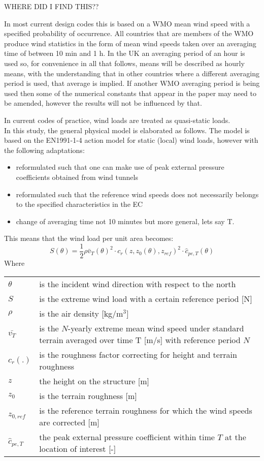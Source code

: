 WHERE DID I FIND THIS??
\begin{framed}
In most current design codes this is based on a WMO mean wind speed with a specified probability of occurrence. All countries that are members of the WMO produce wind statistics in the form of mean wind speeds taken over an averaging time of between 10 min and 1 h. In the UK an averaging period of an hour is used so, for convenience in all that follows, means will be described as hourly means, with the understanding that in other countries where a different averaging period is used, that average is implied. If another WMO averaging period is being used then some of the numerical constants that appear in the paper may need to be amended, however the results will not be influenced by that. 
\end{framed}
In current codes of practice, wind loads are treated as quasi-static loads. \\
In this study, the general physical model is elaborated as follows. The model is based on the EN1991-1-4 action model for static (local) wind loads, however with the following adaptations:
\begin{itemize}
\item reformulated such that one can make use of peak external pressure coefficients obtained from wind tunnels
\item reformulated such that the reference wind speeds does not necessarily belongs to the specified characteristics in the EC
\item change of averaging time not 10 minutes but more general, lets say T. 
\end{itemize}
This means that the wind load per unit area becomes: 
\begin{equation}\label{eq:wind_loads}
S(\theta) = \frac{1}{2}\rho \bar{v}_T(\theta)^2 \cdot c_r(z, z_0(\theta), z_{ref})^2 \cdot  \hat{c}_{pe,T}(\theta) 
\end{equation}
Where\\
\vspace{0.2cm}
\begin{tabular}{l l}\\
$\theta$ & is the incident wind direction with respect to the north\\
$S$ & is the extreme wind load with a certain reference period [N]\\
$\rho$ &  is the air density [kg/m$^3$]\\
$\bar{v_T}$ & is the $N$-yearly extreme mean wind speed under standard terrain averaged over time T [m/s] with reference period $N$ \\
$c_r(.)$ & is the roughness factor correcting for height and terrain roughness\\
$z$ & the height on the structure [m]\\
$z_0$ & is the terrain roughness  [m] \\
$z_{0,ref}$ & is the reference terrain roughness for which the wind speeds are corrected [m]\\
$\hat{c}_{pe,T}$ & the peak external pressure coefficient within time $T$ at the location of interest [-]\\
\end{tabular}


